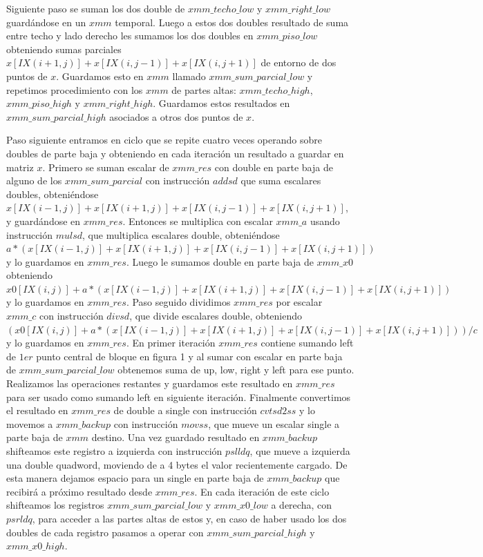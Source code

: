 \par Siguiente paso se suman los dos double de $xmm\_techo\_low$ y $xmm\_right\_low$ guardándose en un $ xmm$ temporal. Luego a estos dos doubles resultado de suma entre techo y lado derecho les sumamos los dos doubles en $xmm\_piso\_low$ obteniendo sumas parciales $x[IX(i+1,j)]+x[IX(i,j-1)]+x[IX(i,j+1)]$ de entorno de dos puntos de $x$. Guardamos esto en $xmm$ llamado $xmm\_sum\_parcial\_low$ y repetimos procedimiento con los $xmm$ de partes altas: $xmm\_techo\_high$, $xmm\_piso\_high$ y $xmm\_right\_high$. Guardamos estos resultados en $xmm\_sum\_parcial\_high$ asociados a otros dos puntos de $x$.\newline

\par Paso siguiente entramos en ciclo que se repite cuatro veces operando sobre doubles de parte baja y obteniendo en cada iteración un resultado a guardar en matriz $x$. Primero se suman escalar de $xmm\_res$ con double en parte baja de alguno de los $xmm\_sum\_parcial$ con instrucción $addsd$ que suma escalares doubles, obteniéndose $x[IX(i-1,j)]+x[IX(i+1,j)]+x[IX(i,j-1)]+x[IX(i,j+1)]$, y guardándose en $xmm\_res$. Entonces se multiplica con escalar $xmm\_a$ usando instrucción $mulsd$, que multiplica escalares double, obteniéndose $a*(x[IX(i-1,j)]+x[IX(i+1,j)]+x[IX(i,j-1)]+x[IX(i,j+1)]) $ y lo guardamos en $xmm\_res$. Luego le sumamos double en parte baja de $xmm\_x0$ obteniendo $x0[IX(i,j)] + a*(x[IX(i-1,j)]+x[IX(i+1,j)]+x[IX(i,j-1)]+x[IX(i,j+1)])$ y lo guardamos en $xmm\_res$. Paso seguido dividimos $xmm\_res$ por escalar $xmm\_c$ con instrucción $divsd$, que divide escalares double, obteniendo $(x0[IX(i,j)] + a*(x[IX(i-1,j)]+x[IX(i+1,j)]+x[IX(i,j-1)]+x[IX(i,j+1)]))/c$ y lo guardamos en $xmm\_res$. En primer iteración $xmm\_res$ contiene sumando left de $1er$ punto central de bloque en figura 1 y al sumar con escalar en parte baja de $xmm\_sum\_parcial\_low$ obtenemos suma de up, low, right y left para ese punto. Realizamos las operaciones restantes y guardamos este resultado en $xmm\_res$ para ser usado como sumando left en siguiente iteración. Finalmente convertimos el resultado en $xmm\_res$ de double a single con instrucción $cvtsd2ss$ y lo movemos a $xmm\_backup$ con instrucción $movss$, que mueve un escalar single a parte baja de $xmm$ destino. Una vez guardado resultado en $xmm\_backup$ shifteamos este registro a izquierda con instrucción $pslldq$, que mueve a izquierda una double quadword, moviendo de a 4 bytes el valor recientemente cargado. De esta manera dejamos espacio para un single en parte baja de $xmm\_backup$ que recibirá a próximo resultado desde $xmm\_res$. En cada iteración de este ciclo shifteamos los registros $xmm\_sum\_parcial\_low$ y $xmm\_x0\_low$ a derecha, con $psrldq$, para acceder a las partes altas de estos y, en caso de haber usado los dos doubles de cada registro pasamos a operar con $xmm\_sum\_parcial\_high$ y $xmm\_x0\_high$.\newline

